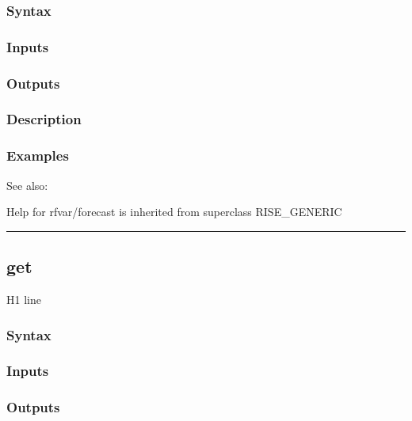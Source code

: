 \documentclass[letterpaper,10pt,english]{sphinxmanual}
\begin{document}
\subsubsection{Syntax}
\label{classes/models/@rfvar/rfvar:id21}

\subsubsection{Inputs}
\label{classes/models/@rfvar/rfvar:id22}

\subsubsection{Outputs}
\label{classes/models/@rfvar/rfvar:id23}

\subsubsection{Description}
\label{classes/models/@rfvar/rfvar:id24}

\subsubsection{Examples}
\label{classes/models/@rfvar/rfvar:id25}
See also:

Help for rfvar/forecast is inherited from superclass RISE\_GENERIC


\bigskip\hrule{}\bigskip



\subsection{get}
\label{classes/models/@rfvar/rfvar:id26}\label{classes/models/@rfvar/rfvar:get}
H1 line


\subsubsection{Syntax}
\label{classes/models/@rfvar/rfvar:id27}

\subsubsection{Inputs}
\label{classes/models/@rfvar/rfvar:id28}

\subsubsection{Outputs}
\label{classes/models/@rfvar/rfvar:id29}
\end{document}
